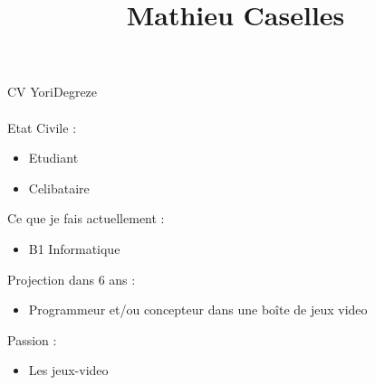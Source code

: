 \documentclass[12pt,oneside,a4paper]{article}
\begin{document}
\title{Mathieu Caselles}
CV YoriDegreze

\paragraph{}

Etat Civile :
\begin{itemize}
\item Etudiant
\item Celibataire
\end{itemize}

Ce que je fais actuellement :
\begin{itemize}
\item  B1 Informatique
\end{itemize}

Projection dans 6 ans  :
\begin{itemize}
\item Programmeur et/ou concepteur dans une boîte de jeux video 
\end{itemize}

Passion :
\begin{itemize}
\item Les jeux-video
\end{itemize}
\end{document}
